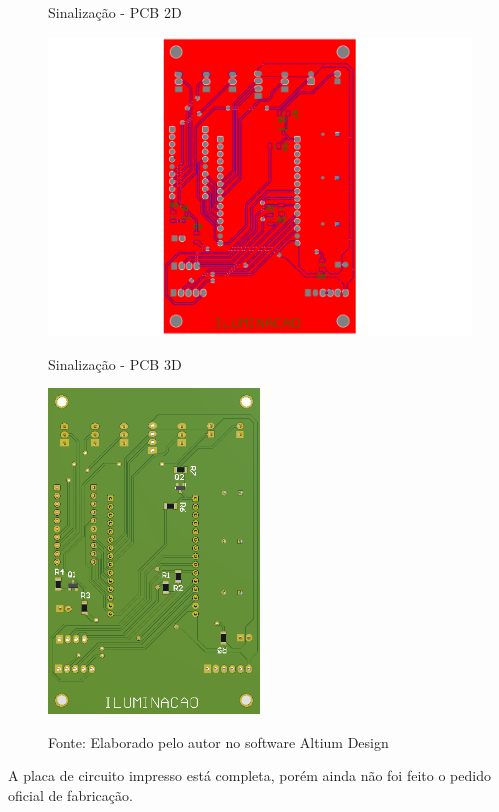 \documentclass[../poliXuniversity_hospital_-USP-report.tex]{subfiles}
\begin{document}
\begin{figure}[!h]
    \centering
    \begin{minipage}{0.5\textwidth}
        \centering
        \caption{Sinalização - PCB 2D}
        \includegraphics[width=1.03\textwidth]{modulos/Sinalização_Official-5.png} 
        \label{fig:figura1minipg}
    \end{minipage}\hfill
    \begin{minipage}{0.5\textwidth}
        \centering
        \caption{Sinalização - PCB 3D }
        \includegraphics[width=0.5\textwidth]{modulos/Sinalização_Official.png} 
        \label{fig:figura1minipg}
    \end{minipage}\hfill
    
    \caption*{Fonte: Elaborado pelo autor no software Altium Design\cite{altium21} }
    \label{fig:Sinalização - PCB 2D3D}
\end{figure}

A placa de circuito impresso está completa, porém ainda não foi feito o pedido oficial de fabricação.

\end{document}
